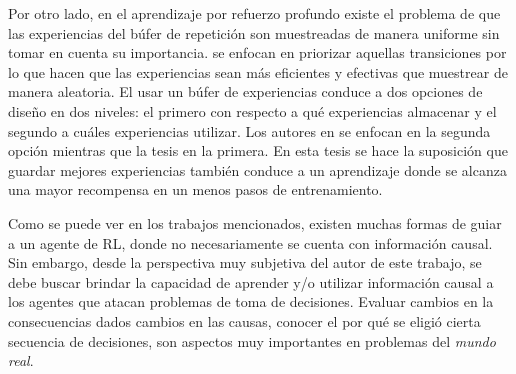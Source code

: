 Por otro lado, en el aprendizaje por refuerzo profundo existe el problema de que las experiencias del búfer de repetición son muestreadas de manera uniforme sin tomar en cuenta su importancia. \citet{schaul2015prioritized}  se enfocan en priorizar aquellas transiciones por lo que hacen que las experiencias sean más eficientes y efectivas que muestrear de manera aleatoria. El usar un búfer de experiencias conduce a dos opciones de diseño en dos niveles: el primero con respecto a qué experiencias almacenar y el segundo a cuáles experiencias utilizar. Los autores en \cite{schaul2015prioritized} se enfocan en la segunda opción mientras que la tesis en la primera. En esta tesis se hace la suposición que guardar mejores experiencias también conduce a un aprendizaje donde se alcanza una mayor recompensa en un menos pasos de entrenamiento.

Como se puede ver en los trabajos mencionados,
existen muchas formas de guiar
a un agente de RL, donde no necesariamente
se cuenta con información causal. Sin embargo, 
desde la perspectiva muy subjetiva del autor de este trabajo, 
se debe buscar 
brindar la capacidad de aprender y/o
utilizar información causal a los agentes que atacan problemas de toma de decisiones. Evaluar
cambios en la consecuencias dados cambios en 
las causas, conocer el por qué se eligió cierta
secuencia de decisiones, son aspectos
muy importantes en problemas del \textit{mundo real}.




